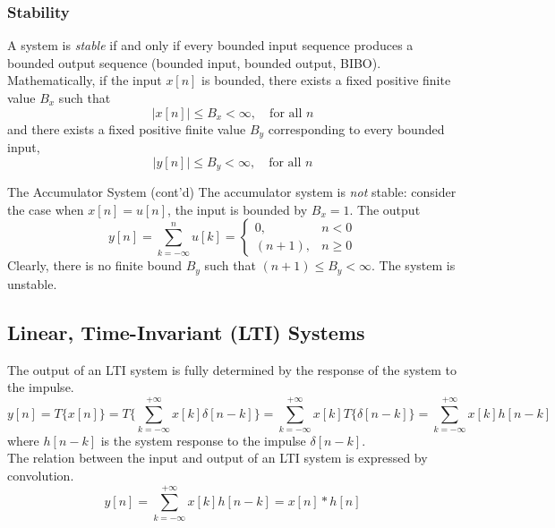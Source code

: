 \subsubsection{Stability}
A system is \textit{stable} if and only if every bounded input sequence produces a bounded output sequence (bounded input, bounded output, BIBO). Mathematically, if the input $x[n]$ is bounded, there exists a fixed positive finite value $B_x$ such that 
\[
    \lvert x[n] \rvert \leq B_x < \infty, \quad \text{for all $n$}
\]
and there exists a fixed positive finite value $B_y$ corresponding to every bounded input, 
\[
     \lvert y[n] \rvert \leq B_y < \infty, \quad \text{for all $n$}
\]

\begin{ex}{The Accumulator System (cont'd)}
    The accumulator system is \textit{not} stable: consider the case when $x[n]=u[n]$, the input is bounded by $B_x = 1$. The output 
    \[
        y[n] = \sum_{k=-\infty}^{n}u[k] = 
        \begin{cases}
        0,      & n<0   \\
        (n+1),  & n \geq 0
        \end{cases}
    \]
    Clearly, there is no finite bound $B_y$ such that $(n+1) \leq B_y < \infty$. The system is unstable.
\end{ex}

\subsection{Linear, Time-Invariant (LTI) Systems}

The output of an LTI system is fully determined by the response of the system to the impulse. 
\[
    y[n] 
    = T\{x[n]\}
    = T \bigg\{\sum_{k=-\infty}^{+\infty} x[k] \delta[n-k] \bigg\}
    = \sum_{k=-\infty}^{+\infty} x[k] T \{\delta[n-k]\}
    = \sum_{k=-\infty}^{+\infty} x[k] h[n-k]
\]
where $h[n-k]$ is the system response to the impulse $\delta[n-k]$.\\

The relation between the input and output of an LTI system is expressed by convolution. 
\[
    y[n] = \sum_{k=-\infty}^{+\infty} x[k] h[n-k] = x[n] * h[n]
\]


